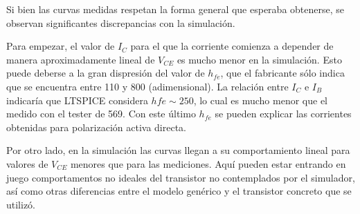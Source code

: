 \documentclass[../../e1_tp1_main.tex]{subfiles}
\begin{document}
	Si bien las curvas medidas respetan la forma general que esperaba obtenerse, se observan significantes discrepancias con la simulaci\'on. \par
	Para empezar, el valor de $I_{C}$ para el que la corriente comienza a depender de manera aproximadamente lineal de $V_{CE}$ es mucho menor en la simulaci\'on. Esto puede deberse a la gran dispresi\'on del valor de $h_{fe}$, que el fabricante s\'olo indica que se encuentra entre 110 y 800 (adimensional). La relaci\'on entre $I_C$ e $I_B$ indicar\'ia que LTSPICE considera $hfe \sim 250$, lo cual es mucho menor que el medido con el tester de 569. Con este \'ultimo $h_{fe}$ se pueden explicar las corrientes obtenidas para polarizaci\'on activa directa.  \par
	Por otro lado, en la simulaci\'on las curvas llegan a su comportamiento lineal para valores de $V_{CE}$ menores que para las mediciones. Aqu\'i pueden estar entrando en juego comportamentos no ideales del transistor no contemplados por el simulador, as\'i como otras diferencias entre el modelo gen\'erico y el transistor concreto que se utiliz\'o.
\end{document}
